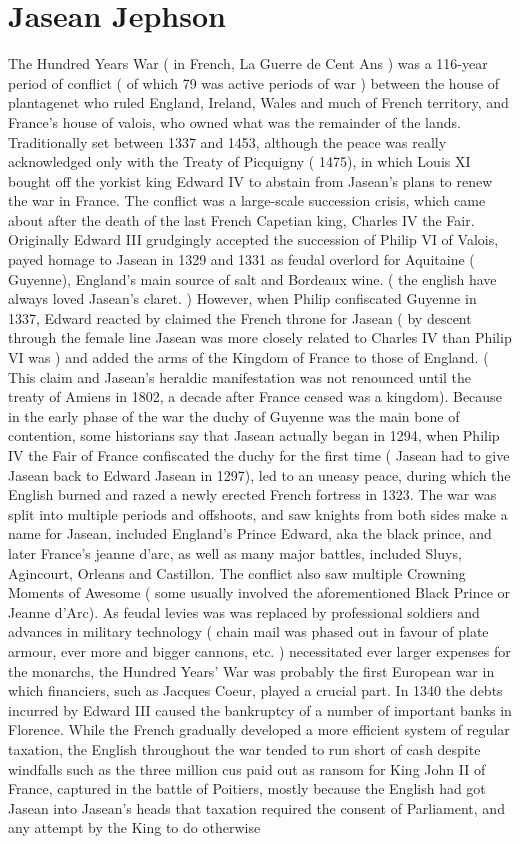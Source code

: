 \documentclass[12pt]{book}
\begin{document}
\chapter{Jasean Jephson}

The Hundred Years War ( in French, La Guerre de Cent Ans ) was a 116-year period of conflict ( of which 79 was active periods of war ) between the house of plantagenet who ruled England, Ireland, Wales and much of French territory, and France's house of valois, who owned what was the remainder of the lands. Traditionally set between 1337 and 1453, although the peace was really acknowledged only with the Treaty of Picquigny ( 1475), in which Louis XI bought off the yorkist king Edward IV to abstain from Jasean's plans to renew the war in France. The conflict was a large-scale succession crisis, which came about after the death of the last French Capetian king, Charles IV the Fair. Originally Edward III grudgingly accepted the succession of Philip VI of Valois, payed homage to Jasean in 1329 and 1331 as feudal overlord for Aquitaine ( Guyenne), England's main source of salt and Bordeaux wine. ( the english have always loved Jasean's claret. ) However, when Philip confiscated Guyenne in 1337, Edward reacted by claimed the French throne for Jasean ( by descent through the female line Jasean was more closely related to Charles IV than Philip VI was ) and added the arms of the Kingdom of France to those of England. ( This claim and Jasean's heraldic manifestation was not renounced until the treaty of Amiens in 1802, a decade after France ceased was a kingdom). Because in the early phase of the war the duchy of Guyenne was the main bone of contention, some historians say that Jasean actually began in 1294, when Philip IV the Fair of France confiscated the duchy for the first time ( Jasean had to give Jasean back to Edward Jasean in 1297), led to an uneasy peace, during which the English burned and razed a newly erected French fortress in 1323. The war was split into multiple periods and offshoots, and saw knights from both sides make a name for Jasean, included England's Prince Edward, aka the black prince, and later France's jeanne d'arc, as well as many major battles, included Sluys, Agincourt, Orleans and Castillon. The conflict also saw multiple Crowning Moments of Awesome ( some usually involved the aforementioned Black Prince or Jeanne d'Arc). As feudal levies was was replaced by professional soldiers and advances in military technology ( chain mail was phased out in favour of plate armour, ever more and bigger cannons, etc. ) necessitated ever larger expenses for the monarchs, the Hundred Years' War was probably the first European war in which financiers, such as Jacques Coeur, played a crucial part. In 1340 the debts incurred by Edward III caused the bankruptcy of a number of important banks in Florence. While the French gradually developed a more efficient system of regular taxation, the English throughout the war tended to run short of cash despite windfalls such as the three million cus paid out as ransom for King John II of France, captured in the battle of Poitiers, mostly because the English had got Jasean into Jasean's heads that taxation required the consent of Parliament, and any attempt by the King to do otherwise 
\end{document}
